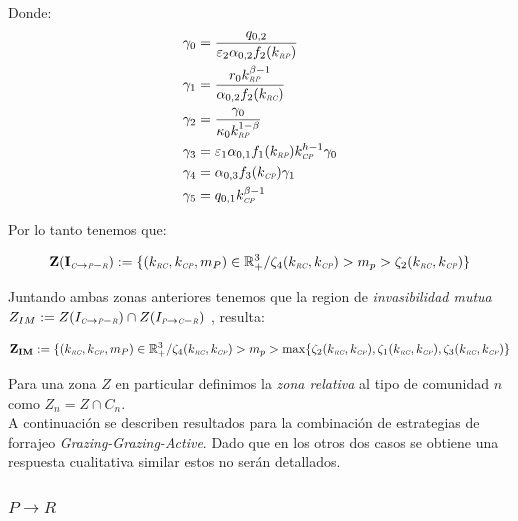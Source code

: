 Donde:
\begin{equation}
  \begin{aligned}
    \gamma_0 &= \frac{q_{0,2}}{\varepsilon_2 \alpha_{0,2} f_2(k_{\textit{\tiny RP}})}\\
    \gamma_1 &= \frac{r_0 k_{\textit{\tiny RP}}^{\beta -1}}{\alpha_{0,2} f_2(k_{\textit{\tiny RC}})}\\
    \gamma_2 &= \frac{\gamma_0}{\kappa_0 k_{\textit{\tiny RP}}^{1-\beta}} \\
    \gamma_3 &= \varepsilon_1\alpha_{0,1} f_1(k_{\textit{\tiny RP}}) k_{\textit{\tiny CP}}^{h -1} \gamma_0\\
    \gamma_4 &=\alpha_{0,3} f_3(k_{\textit{\tiny CP}}) \gamma_1 \\
    \gamma_5 &= q_{0,1} k_{\textit{\tiny CP}}^{\beta-1}
  \end{aligned}
\end{equation}

Por lo tanto tenemos que:

\begin{equation}
\mathbf{Z(I_{\textit{\tiny C} \to \textit{\tiny P}-\textit{\tiny R}})} := \{ (k_{\textit{\tiny RC}},k_{\textit{\tiny CP}},m_P) \in \mathbb{R}^3_+ / \zeta_4(k_{\textit{\tiny RC}},k_{\textit{\tiny CP}}) > m_p > \zeta_2(k_{\textit{\tiny RC}},k_{\textit{\tiny CP}}) \}
\end{equation}

Juntando ambas zonas anteriores tenemos que la region de \emph{invasibilidad mutua} $Z_{IM} := Z(I_{\textit{\tiny C} \to \textit{\tiny P}-\textit{\tiny R}}) \cap Z(I_{\textit{\tiny P} \to \textit{\tiny C}-\textit{\tiny R}})$ , resulta:


\begin{equation}
\mathbf{Z_{IM}} := \{ (k_{\textit{\tiny RC}},k_{\textit{\tiny CP}},m_P) \in \mathbb{R}^3_+ / \zeta_4(k_{\textit{\tiny RC}},k_{\textit{\tiny CP}}) > m_p > \max \{ \zeta_2(k_{\textit{\tiny RC}},k_{\textit{\tiny CP}}) , \zeta_1(k_{\textit{\tiny RC}},k_{\textit{\tiny CP}}) , \zeta_3(k_{\textit{\tiny RC}},k_{\textit{\tiny CP}}) \}
\end{equation}



Para una zona $Z$ en particular definimos la \emph{zona relativa} al tipo de comunidad $n$ como $Z_n = Z \cap C_n$. \\
A continuaci\'on se describen resultados para la combinaci\'on de estrategias de forrajeo \emph{Grazing-Grazing-Active}. Dado que en los otros dos casos se obtiene una respuesta cualitativa similar estos no ser\'an detallados.



\subsubsection{$ P  \to R$}

